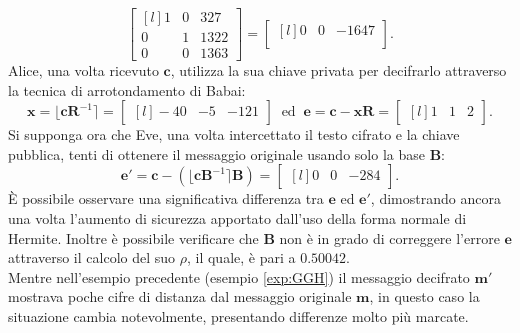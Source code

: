 \begin{exmp}
\[        \begin{bmatrix*}[l]
            1 & 0 & 327\\
            0 & 1 & 1322\\
            0 & 0 & 1363
        \end{bmatrix*}
        =
        \begin{bmatrix*}[l]
            0 & 0 & -1647\\
        \end{bmatrix*}.
    \]
    Alice, una volta ricevuto $\mathbf{c}$, utilizza la sua chiave privata per 
    decifrarlo attraverso la tecnica di arrotondamento di Babai:
    \[
    \mathbf{x} = \lfloor \mathbf{c}\mathbf{R}^{-1}\rceil = 
    \begin{bmatrix*}[l]
        -40  & -5 & -121 
    \end{bmatrix*}
    \ \text{ ed } \ \mathbf{e} = \mathbf{c} - \mathbf{x}\mathbf{R} = 
    \begin{bmatrix*}[l]
        1 & 1 & 2
    \end{bmatrix*}.
    \]
    Si supponga ora che Eve, una volta intercettato il testo cifrato e la chiave pubblica, tenti di 
    ottenere il messaggio originale usando solo la base $\mathbf{B}$:
    \[
        \mathbf{e}' = \mathbf{c} - (\lfloor \mathbf{c}\mathbf{B}^{-1}\rceil \mathbf{B}) = 
        \begin{bmatrix*}[l]
            0 & 0 & -284
        \end{bmatrix*}.
    \]
    È possibile osservare una significativa differenza tra $\mathbf{e}$ ed $\mathbf{e}'$, dimostrando 
    ancora una volta l'aumento di sicurezza apportato dall'uso della forma normale di Hermite. 
    Inoltre è possibile verificare che $\mathbf{B}$ non è in grado di correggere l'errore $\mathbf{e}$
    attraverso il calcolo del suo $\rho$, il quale, è pari a $0.50042$.\\
    Mentre nell'esempio precedente (esempio \ref{exp:GGH}) il messaggio decifrato $\mathbf{m}'$ mostrava
    poche cifre di distanza dal messaggio originale $\mathbf{m}$, in questo caso la 
    situazione cambia notevolmente, presentando differenze molto più marcate. 

\end{exmp}